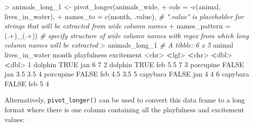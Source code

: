\documentclass[
]{book}
\newenvironment{Shaded}{\begin{snugshade}}{\end{snugshade}}
\newcommand{\AttributeTok}[1]{\textcolor[rgb]{0.77,0.63,0.00}{#1}}
\newcommand{\CommentTok}[1]{\textcolor[rgb]{0.56,0.35,0.01}{\textit{#1}}}
\newcommand{\ConstantTok}[1]{\textcolor[rgb]{0.00,0.00,0.00}{#1}}
\newcommand{\DecValTok}[1]{\textcolor[rgb]{0.00,0.00,0.81}{#1}}
\newcommand{\ErrorTok}[1]{\textcolor[rgb]{0.64,0.00,0.00}{\textbf{#1}}}
\newcommand{\FloatTok}[1]{\textcolor[rgb]{0.00,0.00,0.81}{#1}}
\newcommand{\FunctionTok}[1]{\textcolor[rgb]{0.00,0.00,0.00}{#1}}
\newcommand{\NormalTok}[1]{#1}
\newcommand{\OtherTok}[1]{\textcolor[rgb]{0.56,0.35,0.01}{#1}}
\newcommand{\SpecialCharTok}[1]{\textcolor[rgb]{0.00,0.00,0.00}{#1}}
\newcommand{\StringTok}[1]{\textcolor[rgb]{0.31,0.60,0.02}{#1}}
\begin{document}
\begin{Shaded}
\begin{Highlighting}[]
\SpecialCharTok{\textgreater{}}\NormalTok{ animals\_long\_1 }\OtherTok{\textless{}{-}} \FunctionTok{pivot\_longer}\NormalTok{(animals\_wide,}
\SpecialCharTok{+}                              \AttributeTok{cols =} \SpecialCharTok{{-}}\FunctionTok{c}\NormalTok{(}\StringTok{\textquotesingle{}animal\textquotesingle{}}\NormalTok{, }\StringTok{\textquotesingle{}lives\_in\_water\textquotesingle{}}\NormalTok{),}
\SpecialCharTok{+}                              \AttributeTok{names\_to =} \FunctionTok{c}\NormalTok{(}\StringTok{\textquotesingle{}month\textquotesingle{}}\NormalTok{, }\StringTok{\textquotesingle{}.value\textquotesingle{}}\NormalTok{), }\CommentTok{\# ".value" is placeholder for strings that will be extracted from wide column names }
\SpecialCharTok{+}                              \AttributeTok{names\_pattern =} \StringTok{\textquotesingle{}(.+)\_(.+)\textquotesingle{}}\NormalTok{) }\CommentTok{\# specify structure of wide column names with regex from which long column names will be extracted}
\SpecialCharTok{\textgreater{}}\NormalTok{ animals\_long\_1}
\CommentTok{\# A tibble: 6 x 5}
\NormalTok{  animal    lives\_in\_water month playfulness excitement}
  \SpecialCharTok{\textless{}}\NormalTok{chr}\SpecialCharTok{\textgreater{}}     \ErrorTok{\textless{}}\NormalTok{lgl}\SpecialCharTok{\textgreater{}}          \ErrorTok{\textless{}}\NormalTok{chr}\SpecialCharTok{\textgreater{}}       \ErrorTok{\textless{}}\NormalTok{dbl}\SpecialCharTok{\textgreater{}}      \ErrorTok{\textless{}}\NormalTok{dbl}\SpecialCharTok{\textgreater{}}
\DecValTok{1}\NormalTok{ dolphin   }\ConstantTok{TRUE}\NormalTok{           jan           }\DecValTok{6}          \DecValTok{7}  
\DecValTok{2}\NormalTok{ dolphin   }\ConstantTok{TRUE}\NormalTok{           feb           }\FloatTok{5.5}        \DecValTok{7}  
\DecValTok{3}\NormalTok{ porcupine }\ConstantTok{FALSE}\NormalTok{          jan           }\FloatTok{3.5}        \FloatTok{3.5}
\DecValTok{4}\NormalTok{ porcupine }\ConstantTok{FALSE}\NormalTok{          feb           }\FloatTok{4.5}        \FloatTok{3.5}
\DecValTok{5}\NormalTok{ capybara  }\ConstantTok{FALSE}\NormalTok{          jan           }\DecValTok{4}          \DecValTok{4}  
\DecValTok{6}\NormalTok{ capybara  }\ConstantTok{FALSE}\NormalTok{          feb           }\DecValTok{5}          \DecValTok{4}  
\end{Highlighting}
\end{Shaded}

Alternatively, \texttt{pivot\_longer()} can be used to convert this data frame to a long format where there is one column containing all the playfulness and excitement values:
\end{document}
